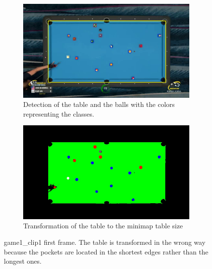 \begin{figure}[H]
	\centering
	\begin{subfigure}[b]{0.48\textwidth}
		\centering
		\includegraphics[width=\textwidth]{images/TableOrientation/g1_c1.jpg}
		\caption{Detection of the table and the balls with the colors representing the classes.}
	\end{subfigure}
	\begin{subfigure}[b]{0.48\textwidth}
		\centering
		\includegraphics[width=\textwidth]{images/Segmentation/game1_clip1_segmented_balls_first_frame.jpg}
		\caption{Transformation of the table to the minimap table size}
	\end{subfigure}
	\caption{game1\_clip1 first frame. The table is transformed in the wrong way because the pockets are located in the shortest edges rather than the longest ones.}
	\label{fig:game1_clip1_orientation}
\end{figure}

